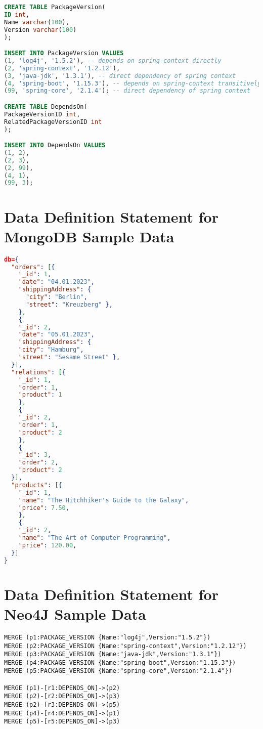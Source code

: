 \begin{lstlisting}[language=SQL, caption=SQL Example Data Creation Statements, captionpos=b, label=lst:DDLStatements]
CREATE TABLE PackageVersion(
ID int,
Name varchar(100),
Version varchar(100)
);

INSERT INTO PackageVersion VALUES 
(1, 'log4j', '1.5.2'), -- depends on spring-context directly
(2, 'spring-context', '1.2.12'),
(3, 'java-jdk', '1.3.1'), -- direct dependency of spring context
(4, 'spring-boot', '1.15.3'), -- depends on spring-context transitively (spring-boot -> log4j -> spring-context)
(99, 'spring-core', '2.1.4'); -- direct dependency of spring context

CREATE TABLE DependsOn(
PackageVersionID int,
RelatedPackageVersionID int
);

INSERT INTO DependsOn VALUES 
(1, 2), 
(2, 3), 
(2, 99),
(4, 1),
(99, 3);
\end{lstlisting}

\section{Data Definition Statement for MongoDB Sample Data} \label{apx:Data Definition Statement for MongoDB Sample Data}
\begin{lstlisting}[language=JSON, caption=Document Database Example Data Creation, captionpos=b, label=lst:MongoDBStatements]
db={
  "orders": [{
    "_id": 1,
    "date": "04.01.2023",
    "shippingAddress": {
      "city": "Berlin",
      "street": "Kreuzberg" },
    },
    {
    "_id": 2,
    "date": "05.01.2023",
    "shippingAddress": {
    "city": "Hamburg",
    "street": "Sesame Street" },
  }],
  "relations": [{
    "_id": 1,
    "order": 1,
    "product": 1
    },
	{
    "_id": 2,
    "order": 1,
    "product": 2
    },
    {
    "_id": 3,
    "order": 2,
    "product": 2
  }],
  "products": [{
    "_id": 1,
    "name": "The Hitchhiker's Guide to the Galaxy",
    "price": 7.50,
    },
    {
    "_id": 2,
    "name": "The Art of Computer Programming",
    "price": 120.00,	
  }]
}
\end{lstlisting}

\section{Data Definition Statement for Neo4J Sample Data} \label{apx:Data Definition Statement for Neo4J Sample Data}
\begin{lstlisting}[caption=Cypher Example Data Creation, captionpos=b, label=lst:CypherStatements]
MERGE (p1:PACKAGE_VERSION {Name:"log4j",Version:"1.5.2"})
MERGE (p2:PACKAGE_VERSION {Name:"spring-context",Version:"1.2.12"})
MERGE (p3:PACKAGE_VERSION {Name:"java-jdk",Version:"1.3.1"})
MERGE (p4:PACKAGE_VERSION {Name:"spring-boot",Version:"1.15.3"})
MERGE (p5:PACKAGE_VERSION {Name:"spring-core",Version:"2.1.4"})

MERGE (p1)-[r1:DEPENDS_ON]->(p2)
MERGE (p2)-[r2:DEPENDS_ON]->(p3)
MERGE (p2)-[r3:DEPENDS_ON]->(p5)
MERGE (p4)-[r4:DEPENDS_ON]->(p1)
MERGE (p5)-[r5:DEPENDS_ON]->(p3)
\end{lstlisting}

